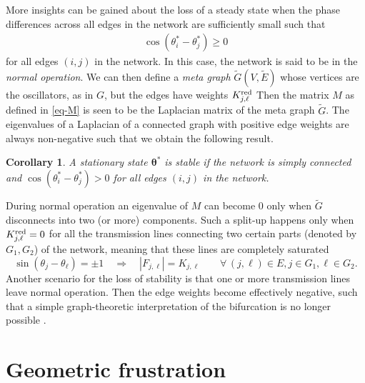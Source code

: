 \documentclass[10pt,aps,pre,preprint,superscriptaddress]{revtex4-1}
\newcommand{\be}{\begin{equation}}
\newcommand{\ee}{\end{equation}}
\renewcommand{\vec}[1]{\boldsymbol{#1}}
\newtheorem{corr}{Corollary}
\begin{document}
More insights can be gained about the loss of a steady state when 
the phase differences across all edges in the network are sufficiently 
small such that
\begin{align}
\label{def:normal-op}
\cos{\left(\theta_i^*-\theta_j^*\right)\ge 0}
\end{align}
for all edges $(i,j)$ in the network. In this case, the network is said to
be in the \emph{normal operation}.  We can then define a \emph{meta graph} 
$\tilde{G}(V,\tilde{E})$ whose vertices are the oscillators, as in $G$, but the
edges have weights
   $
   K_{j,\ell}^{\rm red}
   $
Then the matrix $M$ as defined in \eqref{eq-M} is seen to be the Laplacian matrix 
of the meta graph $\tilde{G}$. The eigenvalues of a Laplacian of a connected graph
with positive edge weights are always non-negative \cite{Newm10} such that
we obtain the following result.

\begin{corr}
\label{corr:stab-phasediff}
A stationary state $\vec{\theta^*}$ is stable if the network is simply connected and
$\cos{\left(\theta_i^*-\theta_j^*\right) > 0}$ for all edges $(i,j)$ in the network.
\end{corr}

During normal operation an eigenvalue of $M$ can become $0$ only when $\tilde{G}$ 
disconnects into two (or more) components. Such a split-up happens only when
$K_{j,\ell}^{\rm red} = 0$ for all the transmission lines connecting two 
certain parts (denoted by $G_1, G_2$) of the network, meaning that these lines
are completely saturated
\be
  \sin{\left(\theta_j-\theta_\ell\right)} = \pm 1  \quad \Rightarrow \quad |F_{j,\ell}| = K_{j,\ell}
    \qquad \forall \, (j,\ell)\in E, j\in G_1,\ell \in G_2. 
\ee
Another scenario for the loss of stability is that one or more transmission lines
leave normal operation. Then the edge weights become effectively negative, such
that a simple graph-theoretic interpretation of the bifurcation is no longer
possible \cite{14bifurcation}.

\section{Geometric frustration}
\label{sec:frustration}
\end{document}
